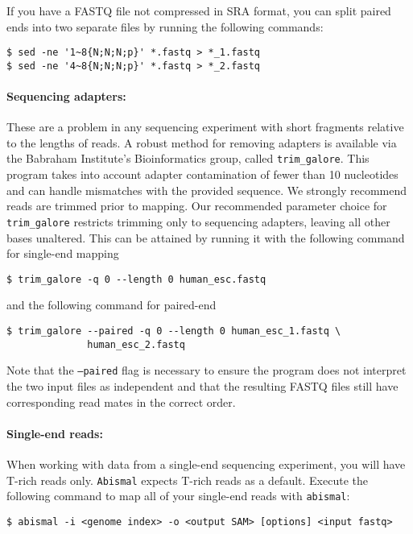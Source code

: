 \documentclass[10pt]{article}
\newcommand{\prog}[1]{\texttt{#1}}
\newcommand{\op}[1]{\texttt{#1}}
\begin{document}
If you have a FASTQ file not compressed in SRA format, you can split paired
ends into two separate files by running the following commands:
\begin{verbatim}
$ sed -ne '1~8{N;N;N;p}' *.fastq > *_1.fastq
$ sed -ne '4~8{N;N;N;p}' *.fastq > *_2.fastq
\end{verbatim}

\paragraph{Sequencing adapters:}

These are a problem in any sequencing experiment with short fragments
relative to the lengths of reads. A robust method for removing
adapters is available via the Babraham Institute's Bioinformatics
group, called \prog{trim\_galore}. This program takes into account
adapter contamination of fewer than 10 nucleotides and can handle
mismatches with the provided sequence. We strongly recommend reads are
trimmed prior to mapping. Our recommended parameter choice for
\prog{trim\_galore} restricts trimming only to sequencing adapters,
leaving all other bases unaltered. This can be attained by running it
with the following command for single-end mapping

\begin{verbatim}
$ trim_galore -q 0 --length 0 human_esc.fastq
\end{verbatim}

and the following command for paired-end

\begin{verbatim}
$ trim_galore --paired -q 0 --length 0 human_esc_1.fastq \
              human_esc_2.fastq
\end{verbatim}

Note that the \op{--paired} flag is necessary to ensure the program
does not interpret the two input files as independent and that the
resulting FASTQ files still have corresponding read mates in the
correct order.

\paragraph{Single-end reads:}

When working with data from a single-end sequencing experiment, you
will have T-rich reads only. \prog{Abismal} expects T-rich reads as a
default. Execute the following command to map all of your
single-end reads with \prog{abismal}:

\begin{verbatim}
$ abismal -i <genome index> -o <output SAM> [options] <input fastq>
\end{verbatim}
\end{document}
